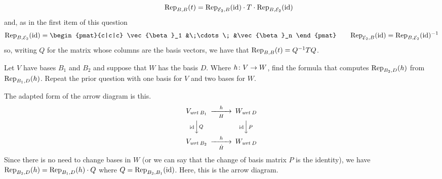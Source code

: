 \begin{exercises}
\begin{answer}
\begin{exparts}
\begin{equation*}
\begin{CD}
            \end{CD}
        \qquad 
            \rep{t}{B,B}=\rep{\identity}{\stdbasis_2,B}
                          \cdot T
                          \cdot \rep{\identity}{B,\stdbasis_2}
          \end{equation*}
          and, as in the first item of this question
          \begin{equation*}
            \rep{\identity}{B,\stdbasis_2}
            =\begin{pmat}{c|c|c}
              \vec{\beta}_1 &\;\cdots\; &\vec{\beta}_n
            \end{pmat}
            \qquad
            \rep{\identity}{\stdbasis_2,B}=\rep{\identity}{B,\stdbasis_2}^{-1}
          \end{equation*}
          so, writing $Q$ for the matrix whose columns are the basis vectors,
          we have that $\rep{t}{B,B}=Q^{-1}TQ$.
      \end{exparts}
    \end{answer}
  \item 
    \begin{exparts}
       \partsitem Let \( V \) have bases \( B_1 \) and \( B_2 \) and 
         suppose that \( W \) has the basis \( D \).
         Where \( \map{h}{V}{W} \), find the formula that computes
         \( \rep{h}{B_2,D} \) from \( \rep{h}{B_1,D} \).
       \partsitem Repeat the prior question with one basis 
         for \( V \) and two bases for \( W \).
     \end{exparts}
     \begin{answer}
       \begin{exparts}
         \partsitem The adapted form of the arrow diagram is this.
           \begin{equation*}
             \begin{CD}
               V_\wrt{B_1}                   @>h>H>        W_\wrt{D}       \\
               @V\scriptsize\identity VQV      @V\scriptsize\identity VPV \\
               V_\wrt{B_2}             @>h>\hat{H}>  W_\wrt{D}
             \end{CD}
           \end{equation*}
           Since there is no need to change bases in 
           \( W \) (or we can
           say that the change of basis matrix $P$ is the identity), we have
           \( \rep{h}{B_2,D}=\rep{h}{B_1,D}\cdot Q \) where
           \( Q=\rep{\identity}{B_2,B_1} \).
         \partsitem Here, this is the arrow diagram. 

\end{exparts}
\end{answer}
\end{exercises}
